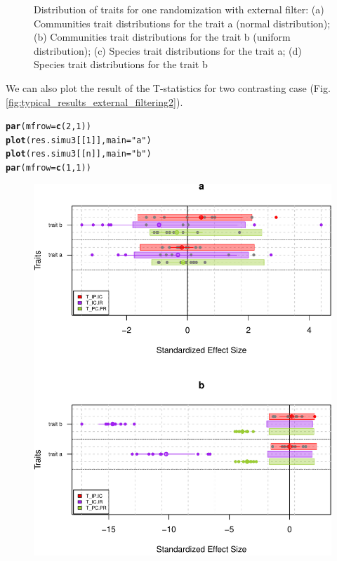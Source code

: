 \documentclass[12pt]{article}\usepackage[]{graphicx}\usepackage[]{color}
\makeatletter
\def\maxwidth{ %
  \ifdim\Gin@nat@width>\linewidth
    \linewidth
  \else
    \Gin@nat@width
  \fi
}
\newcommand{\hlnum}[1]{\textcolor[rgb]{0.686,0.059,0.569}{#1}}%
\newcommand{\hlstr}[1]{\textcolor[rgb]{0.192,0.494,0.8}{#1}}%
\newcommand{\hlstd}[1]{\textcolor[rgb]{0.345,0.345,0.345}{#1}}%
\newcommand{\hlkwc}[1]{\textcolor[rgb]{0.333,0.667,0.333}{#1}}%
\newcommand{\hlkwd}[1]{\textcolor[rgb]{0.737,0.353,0.396}{\textbf{#1}}}%
\newenvironment{kframe}{%
 \def\at@end@of@kframe{}%
 \ifinner\ifhmode%
  \def\at@end@of@kframe{\end{minipage}}%
  \begin{minipage}{\columnwidth}%
 \fi\fi%
 \def\FrameCommand##1{\hskip\@totalleftmargin \hskip-\fboxsep
 \colorbox{shadecolor}{##1}\hskip-\fboxsep
     \hskip-\linewidth \hskip-\@totalleftmargin \hskip\columnwidth}%
 \MakeFramed {\advance\hsize-\width
   \@totalleftmargin\z@ \linewidth\hsize
   \@setminipage}}%
 {\par\unskip\endMakeFramed%
 \at@end@of@kframe}
\newenvironment{knitrout}{}{} %
\makeatother
\begin{document}
\begin{knitrout}
\begin{figure}
{}

\caption[Distribution of traits for one randomization with external filter]{Distribution of traits for one randomization with external filter: (a) Communities trait distributions for the trait a (normal distribution); (b) Communities trait distributions for the trait b (uniform distribution); (c) Species trait distributions for the trait a; (d) Species trait distributions for the trait b}\label{fig:typical_results_external_filtering1}
\end{figure}


\end{knitrout}

We can also plot the result of the T-statistics for two contrasting case (Fig. \ref{fig:typical_results_external_filtering2}).

\begin{knitrout}\small
{}\color{fgcolor}\begin{kframe}
\begin{alltt}
\hlkwd{par}\hlstd{(}\hlkwc{mfrow}\hlstd{=}\hlkwd{c}\hlstd{(}\hlnum{2}\hlstd{,} \hlnum{1}\hlstd{))}
\hlkwd{plot}\hlstd{(res.simu3[[}\hlnum{1}\hlstd{]],} \hlkwc{main} \hlstd{=} \hlstr{"a"}\hlstd{)}
\hlkwd{plot}\hlstd{(res.simu3[[n]],} \hlkwc{main} \hlstd{=} \hlstr{"b"}\hlstd{)}
\hlkwd{par}\hlstd{(}\hlkwc{mfrow}\hlstd{=}\hlkwd{c}\hlstd{(}\hlnum{1}\hlstd{,} \hlnum{1}\hlstd{))}
\end{alltt}
\end{kframe}\begin{figure}

{\centering \includegraphics[width=\maxwidth]{figure/typical_results_external_filtering2-1} 

}
\end{figure}
\end{knitrout}
\end{document}
